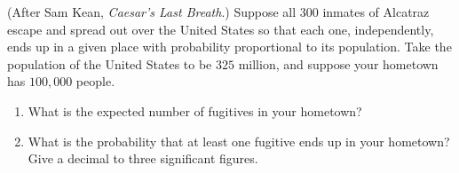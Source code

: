 (After Sam Kean, \emph{Caesar's Last Breath}.) Suppose all $300$ inmates of Alcatraz escape and spread out over the United States so that each one, independently, ends up in a given place with probability proportional to its population. Take the population of the United States to be $325$ million, and suppose your hometown has $100{,}000$ people.
\begin{enumerate}
\item[(a)] What is the expected number of fugitives in your hometown?
\item[(b)] What is the probability that at least one fugitive ends up in your hometown? Give a decimal to three significant figures.
\end{enumerate}

